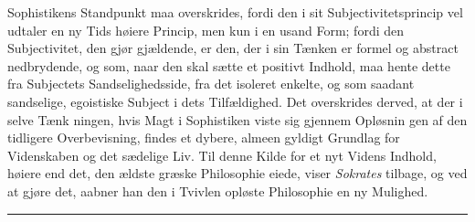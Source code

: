 \documentclass[12pt,a4paper]{book}
\newcommand{\divrule}{\begin{center}\rule{2cm}{0.4pt}\end{center}}
\begin{document}
Sophistikens Standpunkt maa overskrides, fordi den i sit
Subjectivitetsprincip vel udtaler en ny Tids høiere Princip,
men kun i en usand Form; fordi den Subjectivitet, den gjør
gjældende, er den, der i sin Tænken er formel og abstract
nedbrydende, og som, naar den skal sætte et positivt Indhold,
maa hente dette fra Subjectets Sandselighedsside, fra det isoleret
enkelte, og som saadant sandselige, egoistiske Subject i dets
Tilfældighed. Det overskrides derved, at der i selve Tænk\-%
ningen, hvis Magt i Sophistiken viste sig gjennem Opløsnin\-%
gen af den tidligere Overbevisning, findes et dybere, almeen\-%
gyldigt Grundlag for Videnskaben og det sædelige Liv. Til
denne Kilde for et nyt Videns Indhold, høiere end det, den
ældste græske Philosophie eiede, viser \emph{Sokrates} tilbage, og
ved at gjøre det, aabner han den i Tvivlen opløste Philosophie
en ny Mulighed.
\divrule
\end{document}
